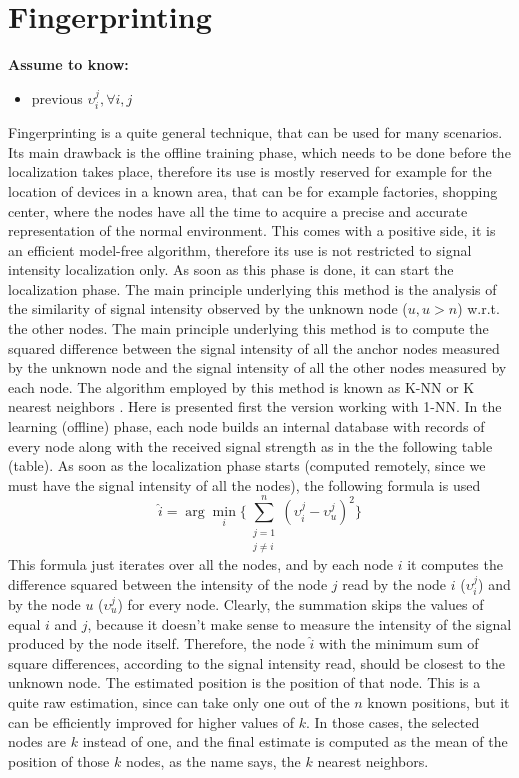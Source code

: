 \documentclass[12pt,twoside]{report}
\begin{document}
\section{Fingerprinting}
  \begin{center}
  \textbf{Assume to know:}
  \begin{itemize}
    \centering
    \item previous $\upsilon_i^j,\forall i,j$
  \end{itemize}
  \end{center}
Fingerprinting \cite{YIU2017235} is a quite general technique, that can be used for many scenarios. Its main drawback is the offline training phase, which needs to be done before the localization takes place, therefore its use is mostly reserved for example for the location of devices in a known area, that can be for example factories, shopping center, where the nodes have all the time to acquire a precise and accurate representation of the normal environment. This comes with a positive side, it is an efficient model-free algorithm, therefore its use is not restricted to signal intensity localization only. As soon as this phase is done, it can start the localization phase. The main principle underlying this method is the analysis of the similarity of signal intensity observed by the unknown node ($u,u>n$) w.r.t. the other nodes. The main principle underlying this method is to compute the squared difference between the signal intensity of all the anchor nodes measured by the unknown node and the signal intensity of all the other nodes measured by each node.
The algorithm employed by this method is known as K-NN or K nearest neighbors \cite{10.5555/1162264}. Here is presented first the version working with 1-NN.
In the learning (offline) phase, each node builds an internal database with records of every node along with the received signal strength as in the the following table (table). As soon as the localization phase starts (computed remotely, since we must have the signal intensity of all the nodes), the following formula is used
\begin{equation}
    \hat{i}=\arg \min_i\bigg\{\sum_{\substack{j=1\\j\neq i}}^n(\upsilon_i^j-\upsilon_{u}^j)^2\bigg\}
\end{equation}
This formula just iterates over all the nodes, and by each node $i$ it computes the difference squared between the intensity of the node $j$ read by the node $i$ ($\upsilon_i^j$) and by the node $u$ ($\upsilon_u^j$) for every node. Clearly, the summation skips the values of equal $i$ and $j$, because it doesn't make sense to measure the intensity of the signal produced by the node itself. Therefore, the node $\hat{i}$ with the minimum sum of square differences, according to the signal intensity read, should be closest to the unknown node. The estimated position is the position of that node. This is a quite raw estimation, since can take only one out of the $n$ known positions, but it can be efficiently improved for higher values of $k$. In those cases, the selected nodes are $k$ instead of one, and the final estimate is computed as the mean of the position of those $k$ nodes, as the name says, the $k$ nearest neighbors.
\end{document}
